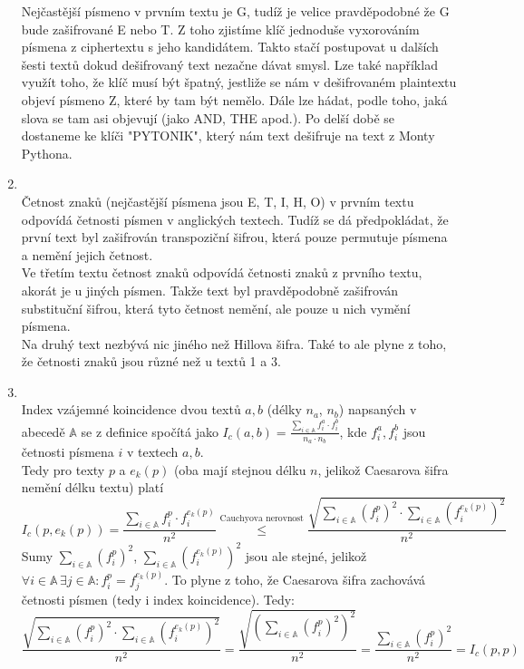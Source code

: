 \documentclass[12pt]{article}
\begin{document}
\begin{enumerate}
		Nejčastější písmeno v prvním textu je G, tudíž je velice pravděpodobné že G bude zašifrované E nebo T. Z toho zjistíme klíč jednoduše vyxorováním písmena z ciphertextu s jeho kandidátem. Takto stačí postupovat u dalších šesti textů dokud dešifrovaný text nezačne dávat smysl. Lze také například využít toho, že klíč musí být špatný, jestliže se nám v dešifrovaném plaintextu objeví písmeno Z, které by tam být nemělo. Dále lze hádat, podle toho, jaká slova se tam asi objevují (jako AND, THE apod.). Po delší době se dostaneme ke klíči "PYTONIK", který nám text dešifruje na text z Monty Pythona.
		\item \quad\\
		Četnost znaků (nejčastější písmena jsou E, T, I, H, O) v prvním textu odpovídá  četnosti písmen v anglických textech. Tudíž se dá předpokládat, že první text byl zašifrován transpoziční šifrou, která pouze permutuje písmena a nemění jejich četnost.\\
		Ve třetím textu četnost znaků odpovídá četnosti znaků z prvního textu, akorát je u jiných písmen. Takže text byl pravděpodobně zašifrován substituční šifrou, která tyto četnost nemění, ale pouze u nich vymění písmena.\\
		Na druhý text nezbývá nic jiného než Hillova šifra. Také to ale plyne z toho, že četnosti znaků jsou různé než u textů 1 a 3. 
		\item \quad\\
		Index vzájemné koincidence dvou textů $a,b$ (délky $n_a$, $n_b$) napsaných v abecedě $\mathbb{A}$  se z definice spočítá jako 
		$I_c(a,b) = \frac{\sum_{i\in \mathbb{A}} f_i^a \cdot f_i^b}{n_a \cdot n_b}$, kde $f_i^a, f_i^b$ jsou  četnosti písmena $i$ v textech $a, b$.\\
		Tedy pro texty $p$ a $e_k(p)$ (oba mají stejnou délku $n$, jelikož Caesarova šifra nemění délku textu) platí\\
		\[
		I_c(p,e_k(p)) = \frac{\sum\limits_{i\in \mathbb{A}} f_i^p \cdot f_i^{e_k(p)}}{n^2} \stackrel{\text{Cauchyova nerovnost}}{\leq} \frac{\sqrt{\sum\limits_{i\in \mathbb{A}} (f_i^p)^2 \cdot \sum\limits_{i\in \mathbb{A}} (f_i^{e_k(p)})^2}}{n^2}
		\]
		Sumy $\sum\limits_{i\in \mathbb{A}} (f_i^p)^2$, $\sum\limits_{i\in \mathbb{A}} (f_i^{e_k(p)})^2$ jsou ale stejné, jelikož $\forall i \in \mathbb{A} \, \exists j \in \mathbb{A} : f_i^p = f_j^{e_k(p)}$. To plyne z toho, že Caesarova šifra zachovává četnosti písmen (tedy i index koincidence). Tedy:
		\[
		\frac{\sqrt{\sum\limits_{i\in \mathbb{A}} (f_i^p)^2 \cdot \sum\limits_{i\in \mathbb{A}} (f_i^{e_k(p)})^2}}{n^2} = \frac{\sqrt{(\sum\limits_{i\in \mathbb{A}} (f_i^p)^2)^2}}{n^2} = \frac{\sum\limits_{i\in \mathbb{A}} (f_i^p)^2}{n^2} = I_c(p,p)
\]
\end{enumerate}
\end{document}
